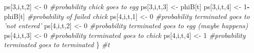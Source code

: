 \documentclass[]{article}
\newenvironment{Shaded}{\begin{snugshade}}{\end{snugshade}}
\newcommand{\DecValTok}[1]{\textcolor[rgb]{0.00,0.00,0.81}{#1}}
\newcommand{\StringTok}[1]{\textcolor[rgb]{0.31,0.60,0.02}{#1}}
\newcommand{\CommentTok}[1]{\textcolor[rgb]{0.56,0.35,0.01}{\textit{#1}}}
\newcommand{\OperatorTok}[1]{\textcolor[rgb]{0.81,0.36,0.00}{\textbf{#1}}}
\newcommand{\NormalTok}[1]{#1}
\begin{document}
\begin{Shaded}
\begin{Highlighting}[]
\NormalTok{      ps[}\DecValTok{3}\NormalTok{,i,t,}\DecValTok{2}\NormalTok{] <-}\StringTok{ }\DecValTok{0}                                \CommentTok{#probability chick goes to egg}
\NormalTok{      ps[}\DecValTok{3}\NormalTok{,i,t,}\DecValTok{3}\NormalTok{] <-}\StringTok{ }\NormalTok{phiB[t]}
\NormalTok{      ps[}\DecValTok{3}\NormalTok{,i,t,}\DecValTok{4}\NormalTok{] <-}\StringTok{ }\DecValTok{1}\OperatorTok{-}\NormalTok{phiB[t]               }\CommentTok{#probability of failed chick}
\NormalTok{      ps[}\DecValTok{4}\NormalTok{,i,t,}\DecValTok{1}\NormalTok{] <-}\StringTok{ }\DecValTok{0}                      \CommentTok{#probability terminated goes to 'not entered'}
\NormalTok{      ps[}\DecValTok{4}\NormalTok{,i,t,}\DecValTok{2}\NormalTok{] <-}\StringTok{ }\DecValTok{0}                       \CommentTok{#probability terminated goes to egg (maybe happens)}
\NormalTok{      ps[}\DecValTok{4}\NormalTok{,i,t,}\DecValTok{3}\NormalTok{] <-}\StringTok{ }\DecValTok{0}                       \CommentTok{#probability terminated goes to chick}
\NormalTok{      ps[}\DecValTok{4}\NormalTok{,i,t,}\DecValTok{4}\NormalTok{] <-}\StringTok{ }\DecValTok{1}                       \CommentTok{#probability terminated goes to terminated}
\NormalTok{  \} }\CommentTok{#t}


\end{Highlighting}
\end{Shaded}
\end{document}
